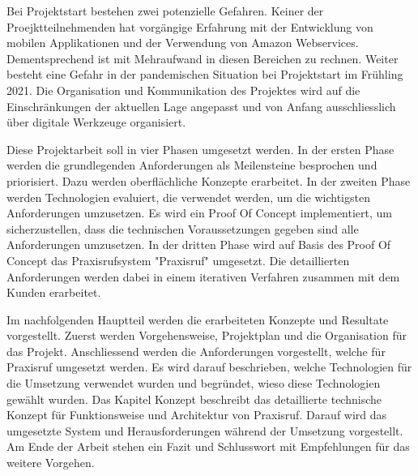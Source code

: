 Bei Projektstart bestehen zwei potenzielle Gefahren.
Keiner der Proejktteilnehmenden hat vorgängige Erfahrung mit der Entwicklung von mobilen Applikationen und der Verwendung von Amazon Webservices.
Dementsprechend ist mit Mehraufwand in diesen Bereichen zu rechnen.
Weiter besteht eine Gefahr in der pandemischen Situation bei Projektstart im Frühling 2021.
Die Organisation und Kommunikation des Projektes wird auf die Einschränkungen der aktuellen Lage angepasst und von Anfang ausschliesslich über digitale Werkzeuge organisiert.

Diese Projektarbeit soll in vier Phasen umgesetzt werden.
In der ersten Phase werden die grundlegenden Anforderungen als Meilensteine besprochen und priorisiert.
Dazu werden oberflächliche Konzepte erarbeitet.
In der zweiten Phase werden Technologien evaluiert, die verwendet werden, um die wichtigsten Anforderungen umzusetzen.
Es wird ein Proof Of Concept implementiert, um sicherzustellen, dass die technischen Voraussetzungen gegeben sind alle Anforderungen umzusetzen.
In der dritten Phase wird auf Basis des Proof Of Concept das Praxisrufsystem "Praxisruf" umgesetzt.
Die detaillierten Anforderungen werden dabei in einem iterativen Verfahren zusammen mit dem Kunden erarbeitet.

Im nachfolgenden Hauptteil werden die erarbeiteten Konzepte und Resultate vorgestellt.
Zuerst werden Vorgehensweise, Projektplan und die Organisation für das Projekt.
Anschliessend werden die Anforderungen vorgestellt, welche für Praxisruf umgesetzt werden.
Es wird darauf beschrieben, welche Technologien für die Umsetzung verwendet wurden und begründet, wieso diese Technologien gewählt wurden.
Das Kapitel Konzept beschreibt das detaillierte technische Konzept für Funktionsweise und Architektur von Praxisruf.
Darauf wird das umgesetzte System und Herausforderungen während der Umsetzung vorgestellt.
Am Ende der Arbeit stehen ein Fazit und Schlusswort mit Empfehlungen für das weitere Vorgehen.

\clearpage
